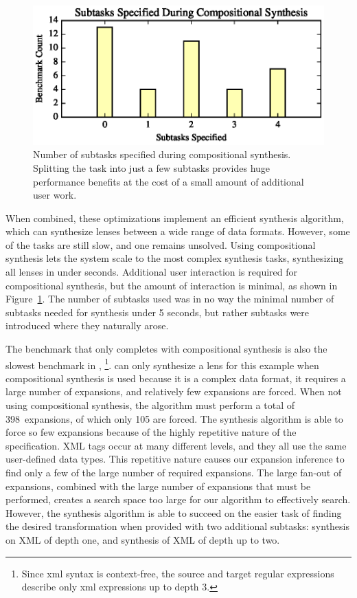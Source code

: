 \documentclass[sigplan,acmsmall]{acmart}
\begin{document}
\begin{figure}
  \includegraphics{generated-graphs/compositional}
  \caption{Number of subtasks specified during compositional synthesis.
    Splitting the task into just a few subtasks provides huge performance
    benefits at the cost of a small amount of additional user work.} 
  \label{fig:compositional-graph}
\end{figure}

When combined, these optimizations implement an efficient synthesis algorithm, which can
synthesize lenses between a wide range of data formats.  However, some of the
tasks are still slow, and one remains unsolved.
Using compositional synthesis lets the system scale to the most complex
synthesis tasks, synthesizing all lenses in under \SynthesizedUnder seconds.
Additional user interaction is required for compositional synthesis, but the
amount of interaction is minimal, as shown in
Figure~\ref{fig:compositional-graph}.  The number of subtasks used was in no way
the minimal number of subtasks needed for synthesis under 5 seconds, but rather
subtasks were introduced where they naturally arose.

The benchmark that only completes with compositional synthesis is also
the slowest benchmark in \FullMode{},
\footnote{Since xml syntax is context-free, 
  the source and target regular 
  expressions describe only xml expressions up to depth 3.}.  \Optician{} can
only synthesize a lens for this example when compositional synthesis is used
because it is a 
complex data format, it requires a large
number of expansions, and relatively few expansions are forced.
When not using compositional synthesis, the algorithm must perform a
total of 
398~expansions, of which only 105 are forced.  
The synthesis algorithm is able to force so few expansions because of the highly
repetitive nature of the  specification.  XML tags occur at many
different levels, and they all use the same user-defined data types.
This repetitive nature causes our
expansion inference to find only a few of the large number of required
expansions.  The large fan-out of expansions, combined with the large number
of expansions that must be performed, creates 
a search space too large for our algorithm to effectively search.  However, the
synthesis algorithm is able to succeed on the easier task of finding the desired
transformation when provided with two additional subtasks: synthesis on XML of
depth one, and synthesis of XML of depth up to two.
\end{document}
